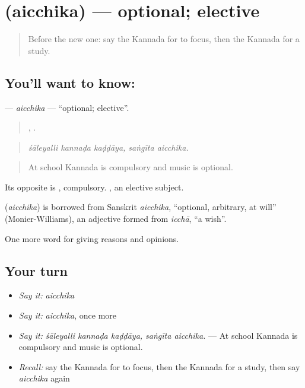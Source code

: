\section[\texorpdfstring{\kn{ಐಚ್ಛಿಕ} (aicchika)}{ಐಚ್ಛಿಕ (aicchika)}]{ (aicchika) — optional; elective}

\label{lesson:KA-C408-aicchika}



\begin{quote}
Before the new one: say the Kannada for to focus, then the Kannada for a study.
\end{quote}

\subsection*{You'll want to know: }
\textbf{} — \emph{aicchika} — \textquotedblleft{}optional; elective\textquotedblright{}.

\begin{quote}
  ,  .
\end{quote}

\begin{quote}
\emph{śāleyalli kannaḍa kaḍḍāya, saṅgīta aicchika.}
\end{quote}

\begin{quote}
At school Kannada is compulsory and music is optional.
\end{quote}

Its opposite is , compulsory.  , an elective subject.

\begin{cousinweb}
\textbf{} (\emph{aicchika}) is borrowed from Sanskrit \emph{aicchika}, \textquotedblleft{}optional, arbitrary, at will\textquotedblright{} (Monier-Williams), an adjective formed from \emph{icchā}, \textquotedblleft{}a wish\textquotedblright{}.
\end{cousinweb}

\begin{grammarlens}[title={What you've built}]
One more word for giving reasons and opinions.
\end{grammarlens}

\subsection*{Your turn}
\begin{itemize}
\raggedright
  \item \emph{Say it:} \emph{aicchika}
  \item \emph{Say it:} \emph{aicchika}, once more
  \item \emph{Say it:} \emph{śāleyalli kannaḍa kaḍḍāya, saṅgīta aicchika.} — At school Kannada is compulsory and music is optional.
  \item \emph{Recall:} say the Kannada for to focus, then the Kannada for a study, then say \emph{aicchika} again
\end{itemize}

